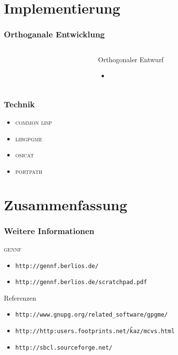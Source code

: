 \documentclass[german]{beamer}
\newcommand{\GENNF}{\textsc{gennf}}
\newcommand{\COMMONLISP}{\textsc{common lisp}}
\newcommand{\LIBGPGME}{\textsc{libgpgme}}
\newcommand{\OSICAT}{\textsc{osicat}}
\newcommand{\PORTPATH}{\textsc{portpath}}
\begin{document}
\section{Implementierung}

\begin{frame}
  \frametitle{Orthoganale Entwicklung}
  \begin{columns}
    \begin{column}{5cm}
      
    \end{column}
    \begin{column}{7cm}
      \begin{block}{Orthogonaler Entwurf}
        \begin{itemize}
        \item
        \end{itemize}
      \end{block}

    \end{column}
  \end{columns}
\end{frame}

\begin{frame}
  \frametitle{Technik}
  \begin{itemize}
  \item \COMMONLISP
  \item \LIBGPGME
  \item \OSICAT
  \item \PORTPATH
  \end{itemize}
\end{frame}

\section{Zusammenfassung}

\begin{frame}
  \frametitle{Weitere Informationen}
  \begin{block}{\GENNF}
    \begin{itemize}
    \item \tt{http://gennf.berlios.de/}
    \item \tt{http://gennf.berlios.de/scratchpad.pdf}
    \end{itemize}
  \end{block}
  \begin{block}{Referenzen}
    \begin{itemize}
    \item \tt{http://www.gnupg.org/related\_software/gpgme/}
    \item \tt{http://http:users.footprints.net/\~kaz/mcvs.html}
    \item \tt{http://sbcl.sourceforge.net/}
    \end{itemize}
  \end{block}
\end{frame}
\end{document}
